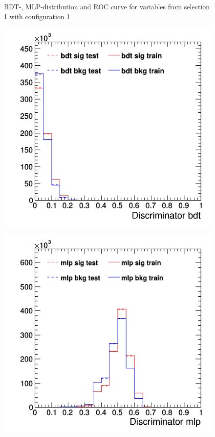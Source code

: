 \documentclass[11pt]{scrartcl}
\begin{document}
\begin{figure}[H]
	\caption{BDT-, MLP-distribution and ROC curve for variables from selection 1 with configuration 1}
	 \label{fig:ROC_s1_config1}
	\end{figure}
	
	\begin{figure}[H]
	\centering
	\begin{minipage}{.5\textwidth}
	  \centering
	  \includegraphics[width=0.75\linewidth]{figures/MVA/select1/config2/discriminator_bdt.png}
	  \label{fig:distr_s1_config2_bdt}
	\end{minipage}%
	\begin{minipage}{.5\textwidth}
	  \centering
	  \includegraphics[width=0.75\linewidth]{figures/MVA/select1/config2/discriminator_mlp.png}

\end{minipage}
\end{figure}
\end{document}
